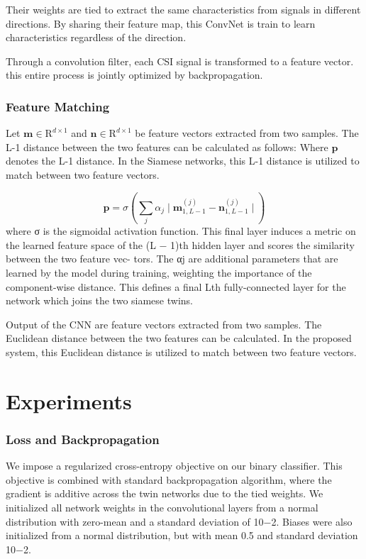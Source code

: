 \documentclass[runningheads]{llncs}
\begin{document}
Their weights are tied to extract the same characteristics from signals in different directions.
By sharing their feature map, this ConvNet is train to learn characteristics regardless of the direction.

Through a convolution filter, each CSI signal is transformed to a feature vector. this entire process is jointly optimized by backpropagation.


\subsubsection{Feature Matching}

Let $\mathbf{m}\in{\mathrm{R}}^{d\times1}$ and $\mathbf{n}\in{\mathrm{R}}^{d\times1}$ be feature vectors extracted from two samples.
The L-1 distance between the two features can be calculated as  follows:
Where $\mathbf{p}$ denotes the L-1 distance. In the Siamese networks, this L-1 distance is utilized to match between two feature vectors.

\begin{equation}
    \mathbf{p} = 
    \sigma(\sum_j\alpha_{j}\mid
    \mathbf{m}_{1,L-1}^{(j)} - 
    \mathbf{n}_{1,L-1}^{(j)}\mid)  
\end{equation}
where σ is the sigmoidal
activation function. This final layer induces a metric on the learned feature space of the (L − 1)th hidden layer and scores the similarity between the two feature vec- tors. The αj are additional parameters that are learned by the model during training, weighting the importance of the component-wise distance. This defines a final Lth fully-connected layer for the network which joins the two siamese twins.

Output of the CNN are feature vectors extracted from two samples. The Euclidean distance between the two features can be calculated.
In the proposed system, this Euclidean distance is utilized to match between two feature vectors.


\section{Experiments}

\subsubsection{Loss and Backpropagation}
 We impose a regularized cross-entropy objective on our binary classifier.
This objective is combined with standard backpropagation algorithm, where the gradient is additive across the twin networks due to the tied weights.
 We initialized all network weights in the convolutional layers from a normal distribution with zero-mean and a standard deviation of 10−2. Biases were also initialized from a normal distribution, but with mean 0.5 and standard deviation 10−2.
\end{document}
